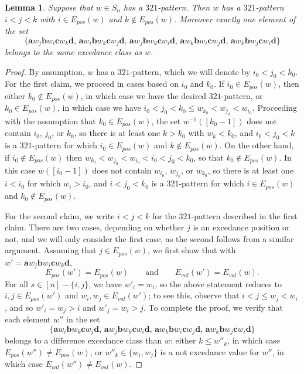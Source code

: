 \documentclass[12pt]{amsart}
\newtheorem{lem}[equation]{Lemma}
\theoremstyle{definition}
\theoremstyle{remark}
\numberwithin{equation}{section}
\renewcommand{\setminus}{-}
\newcommand{\EP}{E_{pos}}
\newcommand{\EV}{E_{val}}
\begin{document}
\begin{lem}
\label{lem:321excedance}
Suppose that $w \in S_{n}$ has a $321$-pattern.  Then $w$ has a $321$-pattern $i < j < k$ with $i \in \EP(w)$ and $k \notin \EP(w)$.  Moreover exactly one element of the set 
\[
\{
\mathbf{a}w_{j}\mathbf{b}w_{i}\mathbf{c}w_{k}\mathbf{d},  \,
\mathbf{a}w_{i}\mathbf{b}w_{k}\mathbf{c}w_{j}\mathbf{d}, \,
\mathbf{a}w_{j}\mathbf{b}w_{k}\mathbf{c}w_{i}\mathbf{d}, \,
\mathbf{a}w_{k}\mathbf{b}w_{i}\mathbf{c}w_{j}\mathbf{d}, \,
\mathbf{a}w_{k}\mathbf{b}w_{j}\mathbf{c}w_{i}\mathbf{d}
\}
\]
belongs to the same excedance class as $w$.
\end{lem}
\begin{proof}
By assumption, $w$ has a $321$-pattern, which we will denote by $i_{0} < j_{0} < k_{0}$.
For the first claim, we proceed in cases based on $i_{0}$ and $k_{0}$.  
If $i_{0} \in \EP(w)$, then either $k_{0} \notin \EP(w)$, in which case we have the desired $321$-pattern, or $k_{0} \in \EP(w)$, in which case we have $i_{0} < j_{0} < k_{0} \le w_{k_{0}} < w_{j_{0}} < w_{i_{0}}$.  
Proceeding with the assumption that $k_{0} \in \EP(w)$, the set $w^{-1}([k_{0}-1])$ does not contain $i_{0}$, $j_{0}$, or $k_{0}$, so there is at least one $k > k_{0}$ with $w_{k} < k_{0}$, and $i_{0} < j_{0} < k$ is a $321$-pattern for which $i_{0} \in \EP(w)$ and $k \notin\EP(w)$.  
On the other hand, if $i_{0} \notin \EP(w)$ then $w_{k_{0}} < w_{j_{0}} < w_{i_{0}} < i_{0} < j_{0} < k_{0}$, so that $k_{0} \notin \EP(w)$.  
In this case $w([i_{0} - 1])$ does not contain $w_{i_{0}}$, $w_{j_{0}}$, or $w_{k_{0}}$, so there is at least one $i < i_{0}$ for which $w_{i} > i_{0}$, and $i < j_{0} < k_{0}$ is a $321$-pattern for which $i \in \EP(w)$ and $k_{0} \notin\EP(w)$.  

For the second claim, we write $i < j < k$ for the $321$-pattern described in the first claim.  There are two cases, depending on whether $j$ is an excedance position or not, and we will only consider the first case, as the second follows from a similar argument.  Assuming that $j \in \EP(w)$, we first show that with $w' = \mathbf{a}w_{j}\mathbf{b}w_{i}\mathbf{c}w_{k}\mathbf{d}$, 
\[
\EP(w') = \EP(w)
\qquad\text{and}\qquad
\EV(w') = \EV(w).
\]
For all $s \in [n] \setminus \{i, j\}$, we have $w'_{i} = w_{i}$, so the above statement reduces to $i, j \in \EP(w')$ and $w_{i}, w_{j} \in \EV(w')$; to see this, observe that $i < j \le w_{j} < w_{i}$, and so $w'_{i} = w_{j} > i$ and $w'_{j} = w_{i} > j$.  
To complete the proof, we verify that each element $w''$ in the set
\[
\{
\mathbf{a}w_{i}\mathbf{b}w_{k}\mathbf{c}w_{j}\mathbf{d}, \,
\mathbf{a}w_{j}\mathbf{b}w_{k}\mathbf{c}w_{i}\mathbf{d}, \,
\mathbf{a}w_{k}\mathbf{b}w_{i}\mathbf{c}w_{j}\mathbf{d}, \,
\mathbf{a}w_{k}\mathbf{b}w_{j}\mathbf{c}w_{i}\mathbf{d}
\}
\]
belongs to a difference excedance class than $w$: either $k \le w''_{k}$, in which case $\EP(w'') \neq \EP(w)$, or $w''_{k} \in \{w_{i}, w_{j}\}$ is a not excedance value for $w''$, in which case $\EV(w'') \neq \EV(w)$.  
\end{proof}
\end{document}

